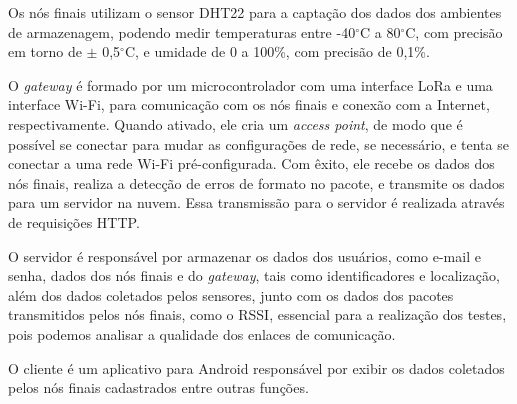     Os nós finais utilizam o sensor DHT22 \cite{ref6} para a captação dos dados dos ambientes de armazenagem, podendo medir temperaturas entre -40$^\circ$C a 80$^\circ$C, com precisão em torno de $\pm$ 0,5$^\circ$C, e umidade de 0 a 100\%, com precisão de 0,1\%.

    O \textit{gateway} é formado por um microcontrolador com uma interface LoRa e uma interface Wi-Fi, para comunicação com os nós finais e conexão com a Internet, respectivamente. Quando ativado, ele cria um \textit{access point}, de modo que é possível se conectar para mudar as configurações de rede, se necessário, e tenta se conectar a uma rede Wi-Fi pré-configurada. Com êxito, ele recebe os dados dos nós finais, realiza a detecção de  erros  de  formato  no  pacote,  e  transmite  os  dados  para um  servidor  na  nuvem.  Essa  transmissão  para  o  servidor  é realizada através de requisições HTTP.
    
    O servidor é responsável por armazenar os dados dos usuários, como e-mail e senha, dados dos nós finais e do \textit{gateway}, tais como identificadores e localização, além dos dados coletados pelos sensores, junto com os dados dos pacotes transmitidos pelos nós finais, como o RSSI, essencial para a realização dos testes, pois podemos analisar a qualidade dos enlaces de comunicação.
    
    O cliente é um aplicativo para Android responsável por exibir os dados coletados pelos nós finais cadastrados entre outras funções.
